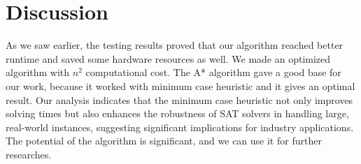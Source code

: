 \documentclass{article}
\begin{document}
\section{Discussion}
As we saw earlier, the testing results proved that our algorithm reached better runtime and saved some hardware resources as well. We made an optimized algorithm with $n^2$ computational cost. The A* algorithm gave a good base for our work, because it worked with minimum case heuristic and it gives an optimal result. Our analysis indicates that the minimum case heuristic not only improves solving times but also enhances the robustness of SAT solvers in handling large, real-world instances, suggesting significant implications for industry applications. The potential of the algorithm is significant, and we can use it for further researches.
\end{document}
